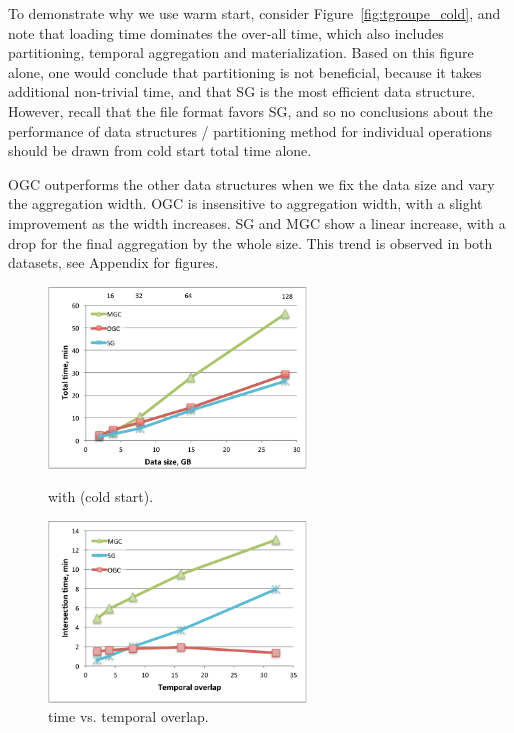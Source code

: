To demonstrate why we use warm start, consider
Figure~\ref{fig:tgroupe_cold}, and note that loading time dominates
the over-all time, which also includes partitioning, temporal
aggregation and materialization.  Based on this figure alone, one
would conclude that partitioning is not beneficial, because it takes
additional non-trivial time, and that SG is the most efficient data
structure.  However, recall that the file format favors SG, and so no
conclusions about the performance of data structures / partitioning
method for individual operations should be drawn from cold start total
time alone.

OGC outperforms the other data structures when we fix the data size
and vary the aggregation width.  OGC is insensitive to aggregation
width, with a slight improvement as the width increases.  SG and MGC
show a linear increase, with a drop for the final aggregation by the
whole size.  This trend is observed in both datasets, see Appendix for
figures.

\begin{figure}
\centering
\begin{minipage}{3in}
  \centering
  \includegraphics[width=2.7in]{figs/tgroupe_cold.pdf}
\vspace{-0.1in}
  \caption{ with  (cold start).}
\label{fig:tgroupe_cold}
\vspace{-0.1in}
\end{minipage}
\begin{minipage}{3in}
  \centering
\includegraphics[width=2.7in]{figs/tand_all_warm.pdf}
\vspace{-0.1in}
\caption{ time vs. temporal overlap.}
\label{fig:tandall}
\vspace{-0.1in}
\end{minipage}
\end{figure}

